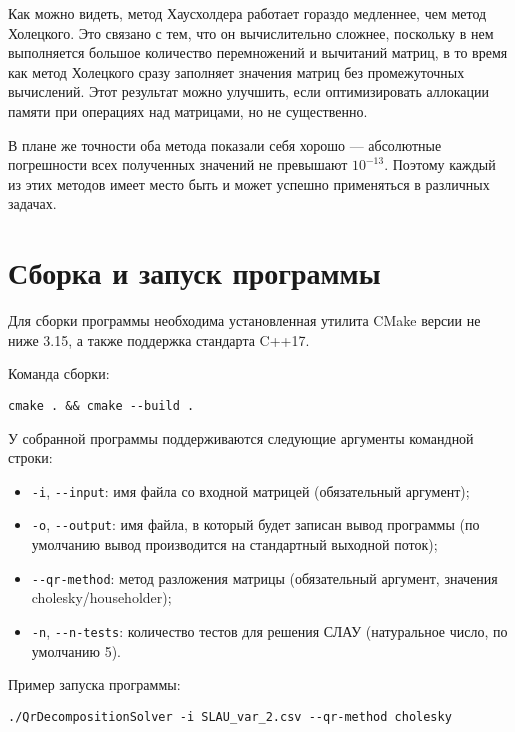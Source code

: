 \documentclass[a4paper,12pt,titlepage,finall]{article}
\begin{document}
Как можно видеть, метод Хаусхолдера работает гораздо медленнее, чем метод Холецкого. Это связано с тем, что он вычислительно сложнее, поскольку в нем выполняется большое количество перемножений и вычитаний матриц, в то время как метод Холецкого сразу заполняет значения матриц без промежуточных вычислений. Этот результат можно улучшить, если оптимизировать аллокации памяти при операциях над матрицами, но не существенно.

В плане же точности оба метода показали себя хорошо — абсолютные погрешности всех полученных значений не превышают $10^{-13}$. Поэтому каждый из этих методов имеет место быть и может успешно применяться в различных задачах.

\section{Сборка и запуск программы}

Для сборки программы необходима установленная утилита CMake версии не ниже 3.15, а также поддержка стандарта C++17.

Команда сборки:
\begin{verbatim}
cmake . && cmake --build .
\end{verbatim}

У собранной программы поддерживаются следующие аргументы командной строки:

\begin{itemize}
\item \texttt{-i}, \texttt{-{}-input}: имя файла со входной матрицей (обязательный аргумент);
\item \texttt{-o}, \texttt{-{}-output}: имя файла, в который будет записан вывод программы (по умолчанию вывод производится на стандартный выходной поток);
\item \texttt{-{}-qr-method}: метод разложения матрицы (обязательный аргумент, значения cholesky/householder);
\item \texttt{-n}, \texttt{-{}-n-tests}: количество тестов для решения СЛАУ (натуральное число, по умолчанию 5).
\end{itemize}

Пример запуска программы:
\begin{verbatim}
./QrDecompositionSolver -i SLAU_var_2.csv --qr-method cholesky
\end{verbatim}
\end{document}
